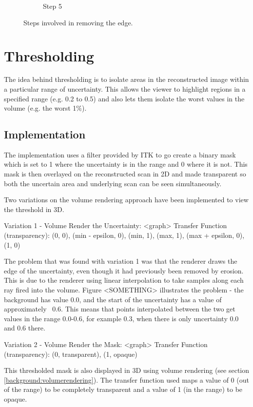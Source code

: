 \begin{figure}[h]
\begin{subfigure}[b]{0.3\textwidth}
    \caption{Step 5}
    \label{fig:erosion5}
  \end{subfigure}  
  \caption{Steps involved in removing the edge.}\label{fig:erosionoverview}
\end{figure}

\newpage
\section{Thresholding}\label{section:thresholding}

The idea behind thresholding is to isolate areas in the reconstructed image within a particular range of uncertainty. This allows the viewer to highlight regions in a specified range (e.g. 0.2 to 0.5) and also lets them isolate the worst values in the volume (e.g. the worst 1$\%$).

\subsection*{Implementation}
The implementation uses a filter provided by ITK to go create a binary mask which is set to 1 where the uncertainty is in the range and 0 where it is not. This mask is then overlayed on the reconstructed scan in 2D and made transparent so both the uncertain area and underlying scan can be seen simultaneously.

Two variations on the volume rendering approach have been implemented to view the threshold in 3D.

Variation 1 - Volume Render the Uncertainty:
<graph> Transfer Function (transparency): (0, 0), (min - epsilon, 0), (min, 1), (max, 1), (max + epsilon, 0), (1, 0)

The problem that was found with variation 1 was that the renderer draws the edge of the uncertainty, even though it had previously been removed by erosion. This is due to the renderer using linear interpolation to take samples along each ray fired into the volume. Figure <SOMETHING> illustrates the problem - the background has value 0.0, and the start of the uncertainty has a value of approximately ~0.6. This means that points interpolated between the two get values in the range 0.0-0.6, for example 0.3, when there is only uncertainty 0.0 and 0.6 there.

Variation 2 - Volume Render the Mask:
<graph> Transfer Function (transparency): (0, transparent), (1, opaque)

This thresholded mask is also displayed in 3D using volume rendering (see section \ref{background:volumerendering}). The transfer function used maps a value of 0 (out of the range) to be completely transparent and a value of 1 (in the range) to be opaque.

